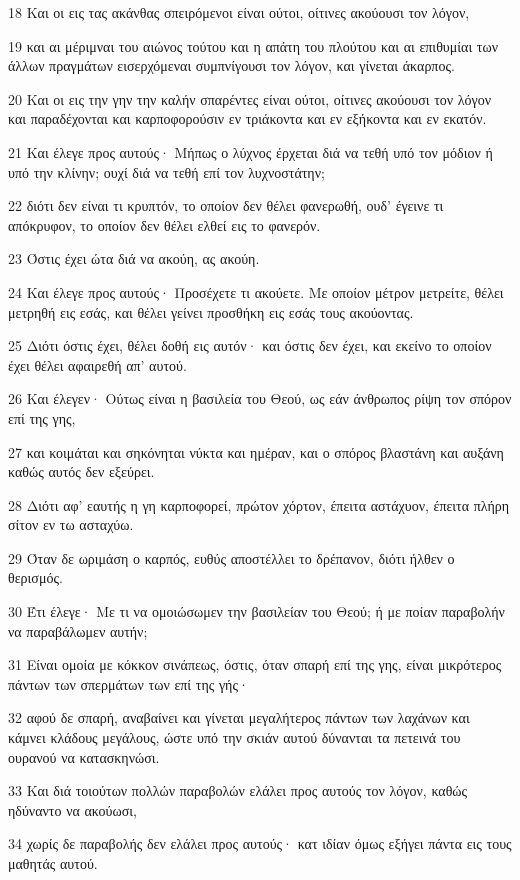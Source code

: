 \par 18 Και οι εις τας ακάνθας σπειρόμενοι είναι ούτοι, οίτινες ακούουσι τον λόγον,
\par 19 και αι μέριμναι του αιώνος τούτου και η απάτη του πλούτου και αι επιθυμίαι των άλλων πραγμάτων εισερχόμεναι συμπνίγουσι τον λόγον, και γίνεται άκαρπος.
\par 20 Και οι εις την γην την καλήν σπαρέντες είναι ούτοι, οίτινες ακούουσι τον λόγον και παραδέχονται και καρποφορούσιν εν τριάκοντα και εν εξήκοντα και εν εκατόν.
\par 21 Και έλεγε προς αυτούς· Μήπως ο λύχνος έρχεται διά να τεθή υπό τον μόδιον ή υπό την κλίνην; ουχί διά να τεθή επί τον λυχνοστάτην;
\par 22 διότι δεν είναι τι κρυπτόν, το οποίον δεν θέλει φανερωθή, ουδ' έγεινε τι απόκρυφον, το οποίον δεν θέλει ελθεί εις το φανερόν.
\par 23 Όστις έχει ώτα διά να ακούη, ας ακούη.
\par 24 Και έλεγε προς αυτούς· Προσέχετε τι ακούετε. Με οποίον μέτρον μετρείτε, θέλει μετρηθή εις εσάς, και θέλει γείνει προσθήκη εις εσάς τους ακούοντας.
\par 25 Διότι όστις έχει, θέλει δοθή εις αυτόν· και όστις δεν έχει, και εκείνο το οποίον έχει θέλει αφαιρεθή απ' αυτού.
\par 26 Και έλεγεν· Ούτως είναι η βασιλεία του Θεού, ως εάν άνθρωπος ρίψη τον σπόρον επί της γης,
\par 27 και κοιμάται και σηκόνηται νύκτα και ημέραν, και ο σπόρος βλαστάνη και αυξάνη καθώς αυτός δεν εξεύρει.
\par 28 Διότι αφ' εαυτής η γη καρποφορεί, πρώτον χόρτον, έπειτα αστάχυον, έπειτα πλήρη σίτον εν τω ασταχύω.
\par 29 Όταν δε ωριμάση ο καρπός, ευθύς αποστέλλει το δρέπανον, διότι ήλθεν ο θερισμός.
\par 30 Έτι έλεγε· Με τι να ομοιώσωμεν την βασιλείαν του Θεού; ή με ποίαν παραβολήν να παραβάλωμεν αυτήν;
\par 31 Είναι ομοία με κόκκον σινάπεως, όστις, όταν σπαρή επί της γης, είναι μικρότερος πάντων των σπερμάτων των επί της γής·
\par 32 αφού δε σπαρή, αναβαίνει και γίνεται μεγαλήτερος πάντων των λαχάνων και κάμνει κλάδους μεγάλους, ώστε υπό την σκιάν αυτού δύνανται τα πετεινά του ουρανού να κατασκηνώσι.
\par 33 Και διά τοιούτων πολλών παραβολών ελάλει προς αυτούς τον λόγον, καθώς ηδύναντο να ακούωσι,
\par 34 χωρίς δε παραβολής δεν ελάλει προς αυτούς· κατ ιδίαν όμως εξήγει πάντα εις τους μαθητάς αυτού.
